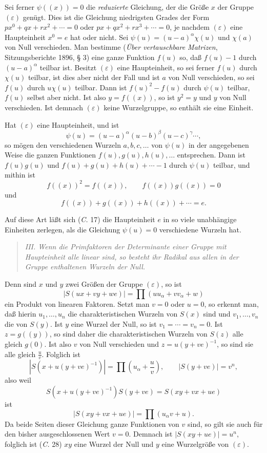\documentclass[11pt]{article}
\newcommand{\eps}{\varepsilon}
\begin{document}
Sei ferner $\psi((x))=0$ die \emph{reduzierte} Gleichung, der die Größe $x$ der Gruppe $(\eps)$ genügt. Dies ist die Gleichung niedrigsten Grades der Form $px^0+qx+rx^2+\cdots=0$ oder $px+qx^2+rx^3+\cdots=0$, je nachdem $(\eps)$ eine Haupteinheit $x^0=e$ hat oder nicht. Sei $\psi(u)=(u-a)^\alpha\chi(u)$ und $\chi(a)$ von Null verschieden. Man bestimme (\emph{Über vertauschbare Matrizen}, Sitzungsberichte 1896, § 3) eine ganze Funktion $f(u)$ so, daß $f(u)-1$ durch $(u-a)^\alpha$ teilbar ist. Besitzt $(\eps)$ eine Haupteinheit, so sei ferner $f(u)$ durch $\chi(u)$ teilbar, ist dies aber nicht der Fall und ist $a$ von Null verschieden, so sei $f(u)$ durch $u\chi(u)$ teilbar. Dann ist $f(u)^2-f(u)$ durch $\psi(u)$ teilbar, $f(u)$ selbst aber nicht. Ist also $y=f((x))$, so ist $y^2=y$ und $y$ von Null verschieden. Ist demnach $(\eps)$ keine Wurzelgruppe, so enthält sie eine Einheit.

Hat $(\eps)$ eine Haupteinheit, und ist
\[
 \psi(u)=(u-a)^\alpha(u-b)^\beta(u-c)^\gamma\cdots,
\]
so mögen den verschiedenen Wurzeln $a,b,c,\ldots$ von $\psi(u)$ in der angegebenen Weise die ganzen Funktionen $f(u),g(u),h(u),\ldots$ entsprechen. Dann ist $f(u)g(u)$ und $f(u)+g(u)+h(u)+\cdots-1$ durch $\psi(u)$ teilbar, und mithin ist
\begin{equation}\tag{3.}
 f((x))^2=f((x)),\qquad f((x))g((x))=0
\end{equation}
und
\begin{equation}\tag{4.}
 f((x))+g((x))+h((x))+\cdots=e.
\end{equation}

Auf diese Art läßt sich (\emph{C.} 17) die Haupteinheit $e$ in so viele unabhängige Einheiten zerlegen, als die Gleichung $\psi(u)=0$ verschiedene Wurzeln hat.

\begin{quote}\itshape
III. Wenn die Primfaktoren der Determinante einer Gruppe mit Haupteinheit alle linear sind, so besteht ihr Radikal aus allen in der Gruppe enthaltenen Wurzeln der Null.
\end{quote}

Denn sind $x$ und $y$ zwei Größen der Gruppe $(\eps)$, so ist
\[
 |S(ux+vy+we)|=\prod (uu_\alpha+vv_\alpha+w)
\]
ein Produkt von linearen Faktoren. Setzt man $v=0$ oder $u=0$, so erkennt man, daß hierin $u_1,\ldots,u_n$ die charakteristischen Wurzeln von $S(x)$ sind und $v_1,\ldots,v_n$ die von $S(y)$. Ist $y$ eine Wurzel der Null, so ist $v_1=\cdots=v_n=0$. Ist $z=g((y))$, so sind daher die charakteristischen Wurzeln von $S(z)$ alle gleich $g(0)$. Ist also $v$ von Null verschieden und $z=u(y+ve)^{-1}$, so sind sie alle gleich $\frac{u}{v}$. Folglich ist
\[
 |S(x+u(y+ve)^{-1})|=\prod\left(u_\alpha+\frac{u}{v}\right),\qquad |S(y+ve)|=v^n,
\]
also weil
\[
 S(x+u(y+ve)^{-1})S(y+ve)=S(xy+vx+ue)
\]
ist
\[
 |S(xy+vx+ue)|=\prod(u_\alpha v+u).
\]
Da beide Seiten dieser Gleichung ganze Funktionen von $v$ sind, so gilt sie auch für den bisher ausgeschlossenen Wert $v=0$. Demnach ist $|S(xy+ue)|=u^n$, folglich ist (\emph{C.} 28) $xy$ eine Wurzel der Null und $y$ eine Wurzelgröße von $(\eps)$.
\end{document}
